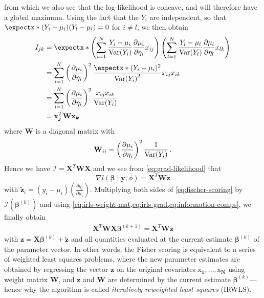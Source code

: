 \documentclass[a4paper]{book}
\begin{document}
from which we also see that the log-likelihood is concave, and will therefore have a global maximum. Using the fact that the $Y_i$ are independent, so that $\expect{(Y_i - \mu_i)(Y_l - \mu_l)} = 0$ for $i \neq l$, we then obtain
\begin{align}
  I_{jk} &= \expect{\left( \sum_{i = 1}^N \frac{Y_i - \mu_i}{\var{Y_i}} \frac{\partial \mu_i}{\partial \eta_i} x_{ij}\right) \left( \sum_{l = 1}^N \frac{Y_l - \mu_l}{\var{Y_l}} \frac{\partial \mu_l}{\partial \eta_l} x_{lk} \right)} \\
  &= \sum_{i = 1}^N \left( \frac{\partial \mu_i}{\partial \eta_i} \right)^2 \frac{\expect{(Y_i - \mu_i)^2}}{\var{Y_i}^2} x_{ij} x_{ik} \\
  &= \sum_{i = 1}^N \left( \frac{\partial \mu_i}{\partial \eta_i} \right)^2 \frac{x_{ij} x_{ik}}{\var{Y_i}} \\
  & = \bm{\mathrm{x}_j}^T \mathbf{W} \bm{\mathrm{x}_k} \label{eq:information-comps}
\end{align}
where $\mathbf{W}$ is a diagonal matrix with
\begin{equation} \label{eq:irls-weight-mat}
  \mathbf{W}_{ii} = \left( \frac{\partial \mu_i}{\partial \eta_i} \right)^2 \frac{1}{\var{Y_i}} \,.
\end{equation}
Hence we have $\mathcal{I} = \mathbf{X}^T \mathbf{W} \mathbf{X}$ and we see from \cref{eq:grad-likelihood} that
\begin{equation} \label{eq:irls-grad}
  \nabla l(\bm{\beta} \mid \mathbf{y}, \phi) = \mathbf{X}^T \mathbf{W} \mathbf{\tilde{z}}
\end{equation}
with $\mathbf{\tilde{z}}_i = (y_i - \mu_i) \left( \frac{\partial \eta_i}{\partial \mu_i} \right)$. Multiplying both sides of \ref{eq:fischer-scoring} by $\mathcal{I}(\bm{\beta}^{(k)})$ and using \cref{eq:irls-weight-mat,eq:irls-grad,eq:information-comps}, we finally obtain
\begin{align}
  \mathbf{X}^T \mathbf{W} \mathbf{X} \bm{\beta}^{(k + 1)} =  \mathbf{X}^T \mathbf{W} \mathbf{z}
\end{align}
with $\mathbf{z} = \mathbf{X} \bm{\beta}^{(k)} + \mathbf{\tilde{z}}$ and all quantities evaluated at the current estimate $\bm{\beta}^{(k)}$ of the parameter vector. In other words, the Fisher scoring is equivalent to a series of weighted least squares problems, where the new parameter estimates are obtained by regressing the vector $\mathbf{z}$ on the original covariates $\bm{\mathrm{x}_1}, \dots, \bm{\mathrm{x}_N}$ using weight matrix $\mathbf{W}$, and $\mathbf{z}$ and $\mathbf{W}$ are determined by the current estimate $\bm{\beta}^{(k)}$---hence why the algorithm is called \emph{iteratively reweighted least squares} (IRWLS).
\end{document}
